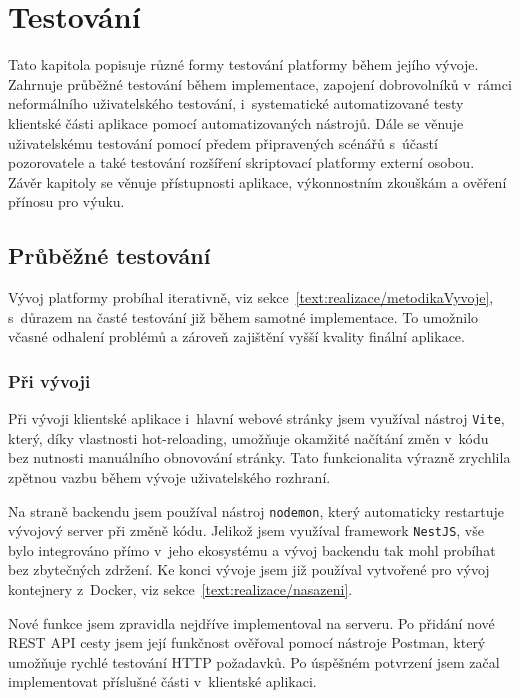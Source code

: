 \chapter{Testování}\label{text:testovani}

\begin{chapterabstract}
Tato kapitola popisuje různé formy testování platformy během jejího vývoje. 
Zahrnuje průběžné testování během implementace, zapojení dobrovolníků v~rámci neformálního uživatelského testování, i~systematické automatizované testy klientské části aplikace pomocí automatizovaných nástrojů. 
Dále se věnuje uživatelskému testování pomocí předem připravených scénářů s~účastí pozorovatele a také testování rozšíření skriptovací platformy externí osobou. 
Závěr kapitoly se věnuje přístupnosti aplikace, výkonnostním zkouškám a ověření přínosu pro výuku.
\end{chapterabstract}

\section{Průběžné testování}\label{text:testovani/prubezne}

Vývoj platformy probíhal iterativně, viz sekce~\ref{text:realizace/metodikaVyvoje}, s~důrazem na časté testování již během samotné implementace.
To umožnilo včasné odhalení problémů a zároveň zajištění vyšší kvality finální aplikace.

\subsection{Při vývoji}

Při vývoji klientské aplikace i~hlavní webové stránky jsem využíval nástroj \texttt{Vite}, který, díky vlastnosti hot-reloading, umožňuje okamžité načítání změn v~kódu bez nutnosti manuálního obnovování stránky.
Tato funkcionalita výrazně zrychlila zpětnou vazbu během vývoje uživatelského rozhraní.

Na straně backendu jsem používal nástroj \texttt{nodemon}, který automaticky restartuje vývojový server při změně kódu. 
Jelikož jsem využíval framework \texttt{NestJS}, vše bylo integrováno přímo v~jeho ekosystému a vývoj backendu tak mohl probíhat bez zbytečných zdržení.
Ke konci vývoje jsem již používal vytvořené pro vývoj kontejnery z~Docker, viz sekce~\ref{text:realizace/nasazeni}.

Nové funkce jsem zpravidla nejdříve implementoval na serveru.
Po přidání nové REST API cesty jsem její funkčnost ověřoval pomocí nástroje Postman, který umožňuje rychlé testování HTTP požadavků.
Po úspěšném potvrzení jsem začal implementovat příslušné části v~klientské aplikaci.

